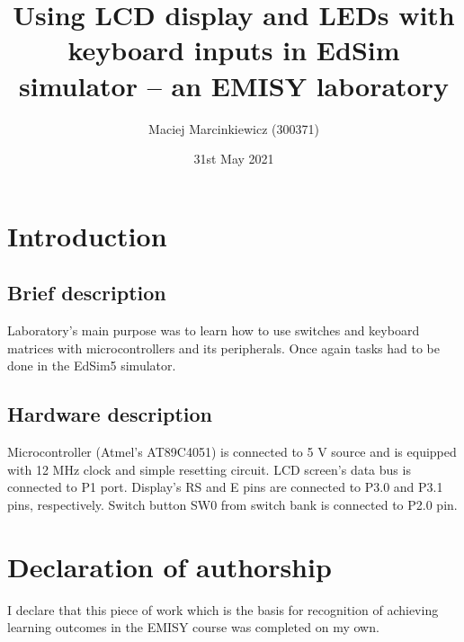 \documentclass{article}
\title{Using LCD display and LEDs with keyboard inputs in EdSim simulator -- an EMISY laboratory}
\author{Maciej Marcinkiewicz (300371)}
\date{31st May 2021}
\begin{document}
\maketitle

\section{Introduction}
\subsection{Brief description}
Laboratory's main purpose was to learn how to use switches and keyboard matrices
with microcontrollers and its peripherals. Once again tasks had to be done
in the EdSim5 simulator.

\subsection{Hardware description}
Microcontroller (Atmel’s AT89C4051) is connected to 5 V source and is equipped with 12 MHz clock and simple resetting circuit.
LCD screen's data bus is connected to P1 port. Display's RS and E pins are
connected to P3.0 and P3.1 pins, respectively. Switch button SW0 from switch
bank is connected to P2.0 pin.

\section*{Declaration of authorship}
I declare that this piece of work which is the basis for recognition of achieving learning outcomes in the EMISY course was completed on my own.
\end{document}

